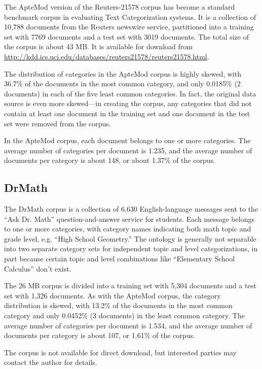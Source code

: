 The ApteMod version of the Reuters-21578 corpus has become a
standard benchmark corpus in evaluating Text Categorization
systems.\cite{yang:99} It is a collection of 10,788 documents from the
Reuters newswire service, partitioned into a training set with 7769
documents and a test set with 3019 documents.  The total size of the
corpus is about 43 MB.  It is available for download from
\url{http://kdd.ics.uci.edu/databases/reuters21578/reuters21578.html}.

The distribution of categories in the ApteMod corpus is highly skewed,
with 36.7\% of the documents in the most common category, and only
0.0185\% (2 documents) in each of the five least common categories.
In fact, the original data source is even more skewed---in creating
the corpus, any categories that did not contain at least one document
in the training set and one document in the test set were removed from
the corpus.\cite{yang:99}

In the ApteMod corpus, each document belongs to one or more
categories.  The average number of categories per document is 1.235,
and the average number of documents per category is about 148, or
about 1.37\% of the corpus.

\subsection{DrMath}

The DrMath corpus is a collection of 6,630 English-language messages
sent to the ``Ask Dr. Math'' question-and-answer service for
students.\cite{drmath} Each message belongs to one or more categories,
with category names indicating both math topic and grade level,
e.g. ``High School Geometry.''  The ontology is generally not
separable into two separate category sets for independent topic and
level categorizations, in part because certain topic and level
combinations like ``Elementary School Calculus'' don't exist.

The 26 MB corpus is divided into a training set with 5,304 documents
and a test set with 1,326 documents.  As with the ApteMod corpus, the
category distribution is skewed, with 13.2\% of the documents in the
most common category and only 0.0452\% (3 documents) in the least
common category.  The average number of categories per document is
1.534, and the average number of documents per category is about 107,
or 1.61\% of the corpus.

The corpus is not available for direct download, but interested
parties may contact the author for details.


